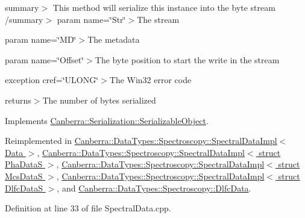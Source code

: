 summary$>$ This method will serialize this instance into the byte stream /summary$>$ param name=\char`\"{}\+Str\char`\"{}$>$The stream

param name=\char`\"{}\+M\+D\char`\"{}$>$The metadata

param name=\char`\"{}\+Offset\char`\"{}$>$The byte position to start the write in the stream

exception cref=\char`\"{}\+U\+L\+O\+N\+G\char`\"{}$>$The Win32 error code

returns$>$The number of bytes serialized

Implements \hyperlink{class_canberra_1_1_serialization_1_1_serializable_object}{Canberra\+::\+Serialization\+::\+Serializable\+Object}.



Reimplemented in \hyperlink{class_canberra_1_1_data_types_1_1_spectroscopy_1_1_spectral_data_impl_aa681684f88b9e64aa2b8208f4525863d_aa681684f88b9e64aa2b8208f4525863d}{Canberra\+::\+Data\+Types\+::\+Spectroscopy\+::\+Spectral\+Data\+Impl$<$ Data $>$}, \hyperlink{class_canberra_1_1_data_types_1_1_spectroscopy_1_1_spectral_data_impl_aa681684f88b9e64aa2b8208f4525863d_aa681684f88b9e64aa2b8208f4525863d}{Canberra\+::\+Data\+Types\+::\+Spectroscopy\+::\+Spectral\+Data\+Impl$<$ struct Pha\+Data\+S $>$}, \hyperlink{class_canberra_1_1_data_types_1_1_spectroscopy_1_1_spectral_data_impl_aa681684f88b9e64aa2b8208f4525863d_aa681684f88b9e64aa2b8208f4525863d}{Canberra\+::\+Data\+Types\+::\+Spectroscopy\+::\+Spectral\+Data\+Impl$<$ struct Mcs\+Data\+S $>$}, \hyperlink{class_canberra_1_1_data_types_1_1_spectroscopy_1_1_spectral_data_impl_aa681684f88b9e64aa2b8208f4525863d_aa681684f88b9e64aa2b8208f4525863d}{Canberra\+::\+Data\+Types\+::\+Spectroscopy\+::\+Spectral\+Data\+Impl$<$ struct Dlfc\+Data\+S $>$}, and \hyperlink{class_canberra_1_1_data_types_1_1_spectroscopy_1_1_dlfc_data_a4b0e2388fef2c2185e4bb2d94b431b11_a4b0e2388fef2c2185e4bb2d94b431b11}{Canberra\+::\+Data\+Types\+::\+Spectroscopy\+::\+Dlfc\+Data}.



Definition at line 33 of file Spectral\+Data.\+cpp.

\mbox{\label{class_canberra_1_1_data_types_1_1_spectroscopy_1_1_spectral_data_ab52ed322617b69a8777302d6b7ccbe8a_ab52ed322617b69a8777302d6b7ccbe8a}} 
